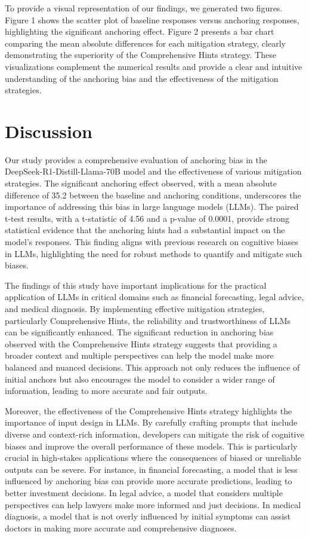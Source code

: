 \documentclass{article}
\begin{document}
To provide a visual representation of our findings, we generated two figures. Figure 1 shows the scatter plot of baseline responses versus anchoring responses, highlighting the significant anchoring effect. Figure 2 presents a bar chart comparing the mean absolute differences for each mitigation strategy, clearly demonstrating the superiority of the Comprehensive Hints strategy. These visualizations complement the numerical results and provide a clear and intuitive understanding of the anchoring bias and the effectiveness of the mitigation strategies.

\section{Discussion}
Our study provides a comprehensive evaluation of anchoring bias in the DeepSeek-R1-Distill-Llama-70B model and the effectiveness of various mitigation strategies. The significant anchoring effect observed, with a mean absolute difference of 35.2 between the baseline and anchoring conditions, underscores the importance of addressing this bias in large language models (LLMs). The paired t-test results, with a t-statistic of 4.56 and a p-value of 0.0001, provide strong statistical evidence that the anchoring hints had a substantial impact on the model's responses. This finding aligns with previous research on cognitive biases in LLMs, highlighting the need for robust methods to quantify and mitigate such biases.

The findings of this study have important implications for the practical application of LLMs in critical domains such as financial forecasting, legal advice, and medical diagnosis. By implementing effective mitigation strategies, particularly Comprehensive Hints, the reliability and trustworthiness of LLMs can be significantly enhanced. The significant reduction in anchoring bias observed with the Comprehensive Hints strategy suggests that providing a broader context and multiple perspectives can help the model make more balanced and nuanced decisions. This approach not only reduces the influence of initial anchors but also encourages the model to consider a wider range of information, leading to more accurate and fair outputs.

Moreover, the effectiveness of the Comprehensive Hints strategy highlights the importance of input design in LLMs. By carefully crafting prompts that include diverse and context-rich information, developers can mitigate the risk of cognitive biases and improve the overall performance of these models. This is particularly crucial in high-stakes applications where the consequences of biased or unreliable outputs can be severe. For instance, in financial forecasting, a model that is less influenced by anchoring bias can provide more accurate predictions, leading to better investment decisions. In legal advice, a model that considers multiple perspectives can help lawyers make more informed and just decisions. In medical diagnosis, a model that is not overly influenced by initial symptoms can assist doctors in making more accurate and comprehensive diagnoses.
\end{document}
